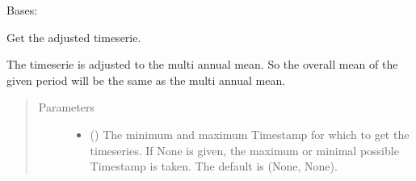 \documentclass[letterpaper,10pt,english]{sphinxmanual}
\begin{document}
\begin{fulllineitems}
\label{\detokenize{weatherDB:weatherDB.station.TemperatureStation}}
\sphinxAtStartPar
Bases: {\hyperref[\detokenize{weatherDB:weatherDB.station.StationTETBase}]{}}

\begin{fulllineitems}
\label{\detokenize{weatherDB:weatherDB.station.TemperatureStation.__init__}}
\end{fulllineitems}


\begin{fulllineitems}
\label{\detokenize{weatherDB:weatherDB.station.TemperatureStation.get_adj}}
\sphinxAtStartPar
Get the adjusted timeserie.

\sphinxAtStartPar
The timeserie is adjusted to the multi annual mean.
So the overall mean of the given period will be the same as the multi annual mean.
\begin{quote}\begin{description}
\item[{Parameters}] \leavevmode\begin{itemize}
\item {} 
\sphinxAtStartPar
{} ({\hyperref[\detokenize{weatherDB.lib:weatherDB.lib.utils.TimestampPeriod}]{}}\sphinxstyleliteralemphasis{\sphinxupquote{(}}\sphinxstyleliteralemphasis{\sphinxupquote{)}}\sphinxstyleliteralemphasis{\sphinxupquote{, }}) \textendash{} The minimum and maximum Timestamp for which to get the timeseries.
If None is given, the maximum or minimal possible Timestamp is taken.
The default is (None, None).


\end{itemize}
\end{description}
\end{quote}
\end{fulllineitems}
\end{fulllineitems}
\end{document}
